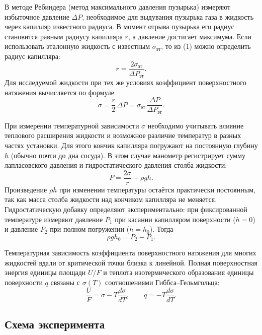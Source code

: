\documentclass[a4paper]{article}
\begin{document}
	В методе Ребиндера (метод максимального давления пузырька) измеряют избыточное давление \(\Delta P\), необходимое для выдувания пузырька газа в жидкость через капилляр известного радиуса. В момент отрыва пузырька его радиус становится равным радиусу капилляра \(r\), а давление достигает максимума. Если использовать эталонную жидкость с известным \(\sigma_{\text{эт}}\), то из (1) можно определить радиус капилляра:
	\[
	r = \frac{2\sigma_{\text{эт}}}{\Delta P_{\text{эт}}}.
	\tag{2}
	\]
	Для исследуемой жидкости при тех же условиях коэффициент поверхностного натяжения вычисляется по формуле
	\[
	\sigma = \frac{r}{2}\,\Delta P = \sigma_{\text{эт}}\,\frac{\Delta P}{\Delta P_{\text{эт}}}.
	\tag{3}
	\]
	
	При измерении температурной зависимости \(\sigma\) необходимо учитывать влияние теплового расширения жидкости и возможное различие температур в разных частях установки. Для этого кончик капилляра погружают на постоянную глубину \(h\) (обычно почти до дна сосуда). В этом случае манометр регистрирует сумму лапласовского давления и гидростатического давления столба жидкости:
	\[
	P = \frac{2\sigma}{r} + \rho g h.
	\tag{4}
	\]
	Произведение \(\rho h\) при изменении температуры остаётся практически постоянным, так как масса столба жидкости над кончиком капилляра не меняется. Гидростатическую добавку определяют экспериментально: при фиксированной температуре измеряют давление \(P_1\) при касании капилляром поверхности (\(h=0\)) и давление \(P_2\) при полном погружении (\(h = h_0\)). Тогда
	\[
	\rho g h_0 = P_2 - P_1.
	\tag{5}
	\]
	
	Температурная зависимость коэффициента поверхностного натяжения для многих жидкостей вдали от критической точки близка к линейной. Полная поверхностная энергия единицы площади \(U/F\) и теплота изотермического образования единицы поверхности \(q\) связаны с \(\sigma(T)\) соотношениями Гиббса–Гельмгольца:
	\[
	\frac{U}{F} = \sigma - T \frac{d\sigma}{dT},
	\qquad
	q = -T \frac{d\sigma}{dT}.
	\tag{6}
	\]
	
	\subsection{Схема эксперимента}
	
\end{document}
